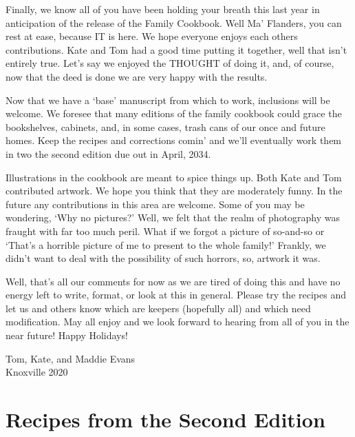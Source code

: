 \documentclass[12pt]{book}
\begin{document}
{\color{red}
Finally, we know all of you have been holding your breath this last year
in anticipation of the release of the Family Cookbook.  Well Ma'
Flanders, you can rest at ease, because IT is here.  We hope everyone
enjoys each others contributions.  Kate and Tom had a good time putting it
together, well that isn't entirely true.  Let's say we enjoyed the
THOUGHT of doing it, and, of course, now that the deed is done we are
very happy with the results.

Now that we have a `base' manuscript from which to work, inclusions will
be welcome.  We foresee that many editions of the family cookbook could
grace the bookshelves, cabinets, and, in some cases, trash cans of our
once and future homes.  Keep the recipes and corrections comin' and we'll
eventually work them in two the second edition due out in April, 2034.

Illustrations in the cookbook are meant to spice things up. Both Kate and
Tom contributed artwork.  We hope you think that they are moderately
funny.  In the future any contributions in this area are welcome.  Some
of you may be wondering, `Why no pictures?'  Well, we felt that the realm
of photography was fraught with far too much peril.  What if we forgot a
picture of so-and-so or `That's a horrible picture of me to present to
the whole family!'  Frankly, we didn't want to deal with the possibility
of such horrors, so, artwork it was.

Well, that's all our comments for now as we are tired of doing this and
have no energy left to write, format, or look at this in general.  Please
try the recipes and let us and others know which are keepers (hopefully
all) and which need modification.  May all enjoy and we look forward to
hearing from all of you  in the near future!  Happy Holidays!
}

\vspace{.5in}
\begin{flushright}
Tom, Kate, and Maddie Evans\\ Knoxville 2020
\end{flushright}


\mainmatter

\part{Recipes from the Second Edition}





\end{document}
